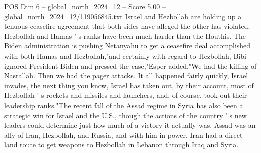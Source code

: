 \begin{textsample}{POS Dim 6 – global\_north\_2024\_12 – Score 5.00 – global\_north\_2024\_12/119056845.txt}
Israel and Hezbollah are holding up a tenuous ceasefire agreement that both sides have alleged the other has violated.
Hezbollah and Hamas ' s ranks have been much harder than the Houthis.
The Biden administration is pushing Netanyahu to get a ceasefire deal accomplished with both Hamas and Hezbollah,"and certainly with regard to Hezbollah, Bibi ignored President Biden and pressed the case,"Esper added."We had the killing of Nasrallah.
Then we had the pager attacks.
It all happened fairly quickly, Israel invades, the next thing you know, Israel has taken out, by their account, most of Hezbollah ' s rockets and missiles and launchers, and, of course, took out their leadership ranks."The recent fall of the Assad regime in Syria has also been a strategic win for Israel and the U.S., though the actions of the country ' s new leaders could determine just how much of a victory it actually was.
Assad was an ally of Iran, Hezbollah, and Russia, and with him in power, Iran had a direct land route to get weapons to Hezbollah in Lebanon through Iraq and Syria.

\end{textsample}

